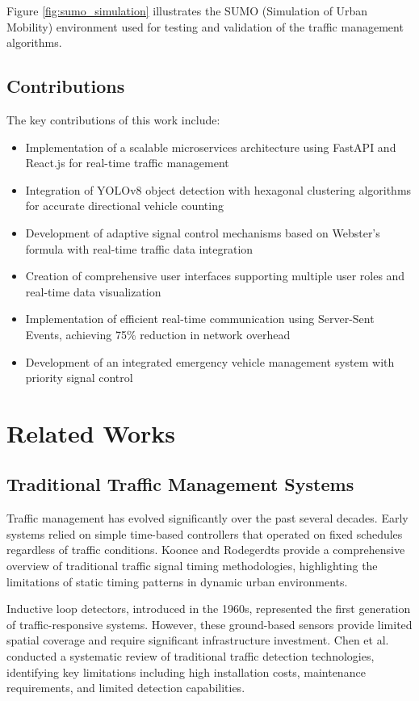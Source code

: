 \documentclass[conference]{IEEEtran}
\begin{document}
Figure \ref{fig:sumo_simulation} illustrates the SUMO (Simulation of Urban Mobility) environment used for testing and validation of the traffic management algorithms.

\subsection{Contributions}

The key contributions of this work include:

\begin{itemize}
\item Implementation of a scalable microservices architecture using FastAPI and React.js for real-time traffic management
\item Integration of YOLOv8 object detection with hexagonal clustering algorithms for accurate directional vehicle counting
\item Development of adaptive signal control mechanisms based on Webster's formula with real-time traffic data integration
\item Creation of comprehensive user interfaces supporting multiple user roles and real-time data visualization
\item Implementation of efficient real-time communication using Server-Sent Events, achieving 75\% reduction in network overhead
\item Development of an integrated emergency vehicle management system with priority signal control
\end{itemize}

\section{Related Works}

\subsection{Traditional Traffic Management Systems}

Traffic management has evolved significantly over the past several decades. Early systems relied on simple time-based controllers that operated on fixed schedules regardless of traffic conditions. Koonce and Rodegerdts provide a comprehensive overview of traditional traffic signal timing methodologies, highlighting the limitations of static timing patterns in dynamic urban environments.

Inductive loop detectors, introduced in the 1960s, represented the first generation of traffic-responsive systems. However, these ground-based sensors provide limited spatial coverage and require significant infrastructure investment. Chen et al. conducted a systematic review of traditional traffic detection technologies, identifying key limitations including high installation costs, maintenance requirements, and limited detection capabilities.
\end{document}
